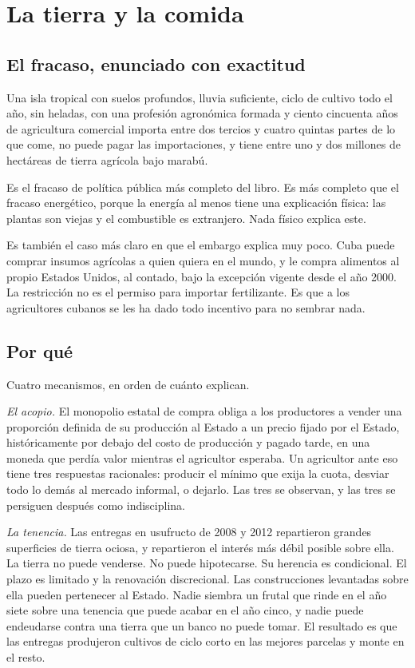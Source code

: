 \chapter{La tierra y la comida}
\label{ch:land}

\section{El fracaso, enunciado con exactitud}

Una isla tropical con suelos profundos, lluvia suficiente, ciclo de cultivo todo el año, sin
heladas, con una profesión agronómica formada y ciento cincuenta años de agricultura comercial
importa entre dos tercios y cuatro quintas partes de lo que come, no puede pagar las
importaciones, y tiene entre uno y dos millones de hectáreas de tierra agrícola bajo
marabú.\unv{}

Es el fracaso de política pública más completo del libro. Es más completo que el fracaso
energético, porque la energía al menos tiene una explicación física: las plantas son viejas y
el combustible es extranjero. Nada físico explica este.

Es también el caso más claro en que el embargo explica muy poco. Cuba puede comprar insumos
agrícolas a quien quiera en el mundo, y le compra alimentos al propio Estados Unidos, al
contado, bajo la excepción vigente desde el año 2000. La restricción no es el permiso para
importar fertilizante. Es que a los agricultores cubanos se les ha dado todo incentivo para no
sembrar nada.

\section{Por qué}

Cuatro mecanismos, en orden de cuánto explican.

\emph{El acopio.} El monopolio estatal de compra obliga a los productores a vender una
proporción definida de su producción al Estado a un precio fijado por el Estado,
históricamente por debajo del costo de producción y pagado tarde, en una moneda que perdía
valor mientras el agricultor esperaba. Un agricultor ante eso tiene tres respuestas
racionales: producir el mínimo que exija la cuota, desviar todo lo demás al mercado informal,
o dejarlo. Las tres se observan, y las tres se persiguen después como indisciplina.

\emph{La tenencia.} Las entregas en usufructo de 2008 y 2012 repartieron grandes superficies
de tierra ociosa, y repartieron el interés más débil posible sobre ella. La tierra no puede
venderse. No puede hipotecarse. Su herencia es condicional. El plazo es limitado y la
renovación discrecional. Las construcciones levantadas sobre ella pueden pertenecer al Estado.
Nadie siembra un frutal que rinde en el año siete sobre una tenencia que puede acabar en el
año cinco, y nadie puede endeudarse contra una tierra que un banco no puede tomar. El
resultado es que las entregas produjeron cultivos de ciclo corto en las mejores parcelas y
monte en el resto.

